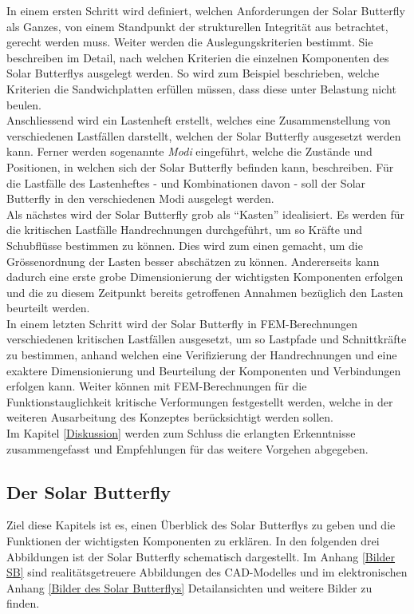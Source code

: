 In einem ersten Schritt wird definiert, welchen Anforderungen der Solar Butterfly als Ganzes, von einem Standpunkt der strukturellen Integrität aus betrachtet, gerecht werden muss. Weiter werden die Auslegungskriterien bestimmt. Sie beschreiben im Detail, nach welchen Kriterien die einzelnen Komponenten des Solar Butterflys ausgelegt werden. So wird zum Beispiel beschrieben, welche Kriterien die Sandwichplatten erfüllen müssen, dass diese unter Belastung nicht beulen.\\
Anschliessend wird ein Lastenheft erstellt, welches eine Zusammenstellung von verschiedenen Lastfällen darstellt, welchen der Solar Butterfly ausgesetzt werden kann. Ferner werden sogenannte \emph{Modi} eingeführt, welche die Zustände und Positionen, in welchen sich der Solar Butterfly befinden kann, beschreiben. Für die Lastfälle des Lastenheftes - und Kombinationen davon - soll der Solar Butterfly in den verschiedenen Modi ausgelegt werden.\\
Als nächstes wird der Solar Butterfly grob als ``Kasten'' idealisiert. Es werden für die kritischen Lastfälle Handrechnungen durchgeführt, um so Kräfte und Schubflüsse bestimmen zu können. Dies wird zum einen gemacht, um die Grössenordnung der Lasten besser abschätzen zu können. Andererseits kann dadurch eine erste grobe Dimensionierung der wichtigsten Komponenten erfolgen und die zu diesem Zeitpunkt bereits getroffenen Annahmen bezüglich den Lasten beurteilt werden.\\
In einem letzten Schritt wird der Solar Butterfly in FEM-Berechnungen verschiedenen kritischen Lastfällen ausgesetzt, um so Lastpfade und Schnittkräfte zu bestimmen, anhand welchen eine Verifizierung der Handrechnungen und eine exaktere Dimensionierung und Beurteilung der Komponenten und Verbindungen erfolgen kann. Weiter können mit FEM-Berechnungen für die Funktionstauglichkeit kritische Verformungen festgestellt werden, welche in der weiteren Ausarbeitung des Konzeptes berücksichtigt werden sollen.\\
Im Kapitel \ref{Diskussion} werden zum Schluss die erlangten Erkenntnisse zusammengefasst und Empfehlungen für das weitere Vorgehen abgegeben.

\subsection{Der Solar Butterfly}
Ziel diese Kapitels ist es, einen Überblick des Solar Butterflys zu geben und die Funktionen der wichtigsten Komponenten zu erklären.
In den folgenden drei Abbildungen ist der Solar Butterfly schematisch dargestellt. Im Anhang \ref{Bilder SB} sind realitätsgetreuere Abbildungen des CAD-Modelles und im elektronischen Anhang \ref{Bilder des Solar Butterflys} Detailansichten und weitere Bilder zu finden.

